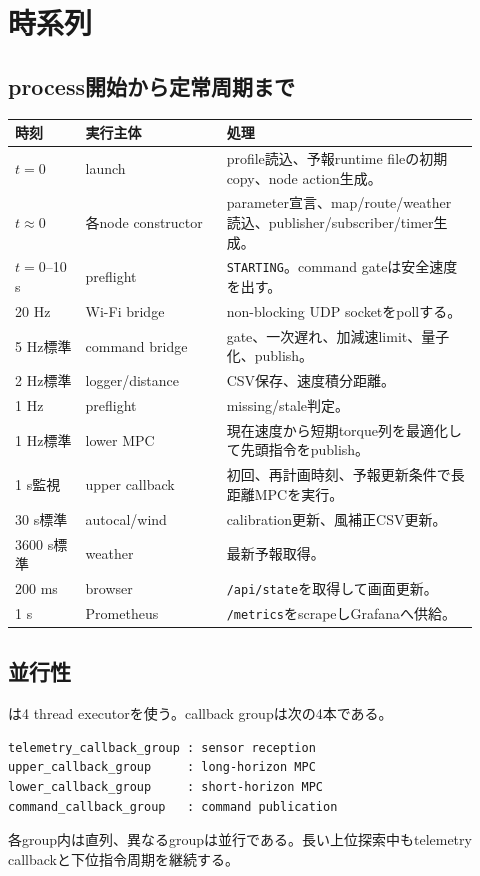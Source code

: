 \documentclass[a4paper,10pt,oneside]{book}
\begin{document}
\chapter{時系列}
\section{process開始から定常周期まで}
\begin{longtable}{p{0.14\linewidth}p{0.28\linewidth}p{0.50\linewidth}}
\toprule
時刻 & 実行主体 & 処理\\\midrule
\endhead
$t=0$ & launch & profile読込、予報runtime fileの初期copy、node action生成。\\
$t\approx0$ & 各node constructor & parameter宣言、map/route/weather読込、publisher/subscriber/timer生成。\\
$t=0$--10 s & preflight & \texttt{STARTING}。command gateは安全速度を出す。\\
20 Hz & Wi-Fi bridge & non-blocking UDP socketをpollする。\\
5 Hz標準 & command bridge & gate、一次遅れ、加減速limit、量子化、publish。\\
2 Hz標準 & logger/distance & CSV保存、速度積分距離。\\
1 Hz & preflight & missing/stale判定。\\
1 Hz標準 & lower MPC & 現在速度から短期torque列を最適化して先頭指令をpublish。\\
1 s監視 & upper callback & 初回、再計画時刻、予報更新条件で長距離MPCを実行。\\
30 s標準 & autocal/wind & calibration更新、風補正CSV更新。\\
3600 s標準 & weather & 最新予報取得。\\
200 ms & browser & \texttt{/api/state}を取得して画面更新。\\
1 s & Prometheus & \texttt{/metrics}をscrapeしGrafanaへ供給。\\
\bottomrule
\end{longtable}

\section{並行性}
 は4 thread executorを使う。callback groupは次の4本である。
\begin{lstlisting}[numbers=none]
telemetry_callback_group : sensor reception
upper_callback_group     : long-horizon MPC
lower_callback_group     : short-horizon MPC
command_callback_group   : command publication
\end{lstlisting}
各group内は直列、異なるgroupは並行である。長い上位探索中もtelemetry callbackと下位指令周期を継続する。
\end{document}
